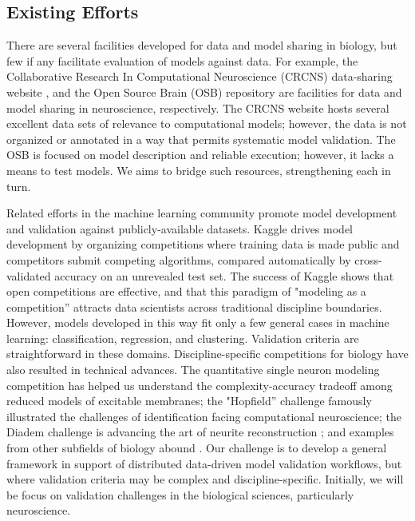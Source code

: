 \documentclass[11pt,letterpaper]{article}
\begin{document}
\subsection{Existing Efforts}\label{sec:existing_efforts}
There are several facilities developed for data and model sharing in biology, but few if any facilitate evaluation of models against data.  For example, the Collaborative Research In Computational Neuroscience (CRCNS) data-sharing website \cite{crcns_url}, and the Open Source Brain (OSB) repository \cite{osb_url} are facilities for data and model sharing in neuroscience, respectively.  The CRCNS website hosts several excellent data sets of relevance to computational models; however, the data is not organized or annotated in a way that permits systematic model validation.  The OSB is focused on model description and reliable execution; however, it lacks a means to test models. We aims to bridge such resources, strengthening each in turn.

Related efforts in the machine learning community promote model development and validation against publicly-available datasets.  Kaggle \cite{kaggle_url} drives model development by organizing competitions where training data is made public and competitors submit competing algorithms, compared automatically by cross-validated accuracy on an unrevealed test set. The success of Kaggle \cite{carpenter_may_2011} shows that open competitions are effective, and that this paradigm of "modeling as a competition'' attracts data scientists across traditional discipline boundaries. However, models developed in this way fit only a few general cases in machine learning: classification, regression, and clustering. Validation criteria are straightforward in these domains. Discipline-specific competitions for biology have also resulted in technical advances.  The quantitative single neuron modeling competition \cite{jolivet_quantitative_2008} has helped us understand the complexity-accuracy tradeoff among reduced models of excitable membranes; the "Hopfield'' challenge \cite{hopfield_what_2000} famously illustrated the challenges of identification facing computational neuroscience; the Diadem challenge is advancing the art of neurite reconstruction \cite{diadem_url}; and examples from other subfields of biology abound \cite{dream_url}. Our challenge is to develop a general framework in support of distributed data-driven model validation workflows, but where validation criteria may be complex and discipline-specific. Initially, we will be focus on validation challenges in the biological sciences, particularly neuroscience. 
\end{document}
